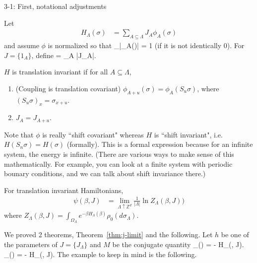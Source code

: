 {\color{blue}3-1: First, notational adjustments}

Let
\begin{align*}
H_\Lambda(\sigma)&=\sum_{A\subseteq \Lambda} J_A\phi_A(\sigma)
\end{align*}
and assume $\phi$ is normalized so that 
\be
\sup_\sigma |\phi_A(\sigma)|  = 1
\ee
(if it is not identically 0). For $J=\{1_A\}$, define 
\be
\left{}\right\Vert = \sum_{A}  |J_A|.
\ee
\begin{definition}
$H$ is translation invariant if for all $A\subseteq \Lambda$,
\begin{enumerate}
\item
(Coupling is translation covariant)
$\phi_{A+u}(\sigma) = \phi_A(S_u\sigma)$, where $(S_u\sigma)_x = \sigma_{x+u}$. 
\item
$J_A=J_{A+u}$.
\end{enumerate}
\end{definition}
Note that $\phi$ is really ``shift covariant" whereas $H$ is ``shift invariant", i.e. $H(S_n\sigma) = H(\sigma)$ (formally). This is a formal expression because for an infinite system, the energy is infinite. (There are various ways to make sense of this mathematically. For example, you can look at a finite system with periodic bounary conditions, and we can talk about shift invariance there.)

For translation invariant Hamiltonians,
\begin{align*}
\psi(\beta, J) &=\lim_{\Lambda \uparrow \mathbb{Z}^d} \frac{1}{|\Lambda|} \ln Z_{\Lambda} (\beta, J))
\end{align*}
where $Z_{\Lambda}(\beta, J) = \int_{\Omega_\Lambda} e^{-\beta H_{\Lambda}(\beta)}\rho_0(d\sigma_{\Lambda})$.

We proved 2 theorems, Theorem~\ref{thm:j-limit} and the following.
Let $h$ be one of the parameters of $J=\{J_\Lambda\}$ and $M$ be the conjugate quantity 
\beM_\Lambda(\sigma) = - H_{\Lambda}(\beta, J).\ee
\beM_\Lambda(\sigma) = - H_{\Lambda}(\beta, J).\ee
The example to keep in mind is the following.

